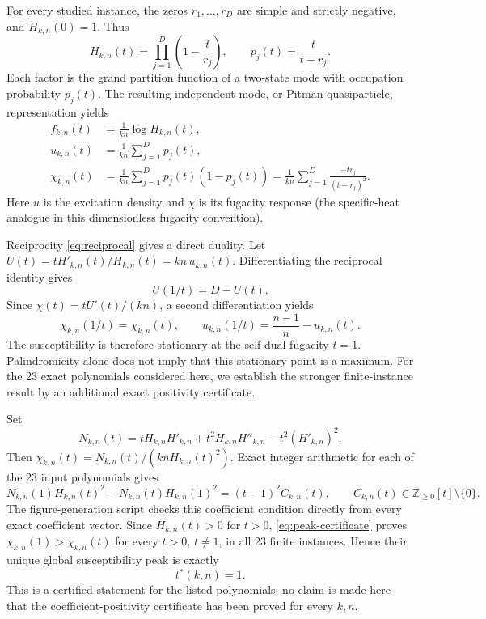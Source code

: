 \documentclass[11pt]{article}
\newcommand{\Z}{\mathbb{Z}}
\begin{document}
For every studied instance, the zeros $r_1,\ldots,r_D$ are simple and strictly negative, and $H_{k,n}(0)=1$. Thus
\begin{equation}
  H_{k,n}(t)=\prod_{j=1}^{D}\left(1-\frac{t}{r_j}\right),
  \qquad
  p_j(t)=\frac{t}{t-r_j}.
  \label{eq:pitman-factorization}
\end{equation}
Each factor is the grand partition function of a two-state mode with occupation probability $p_j(t)$. The resulting independent-mode, or Pitman quasiparticle, representation yields
\begin{align}
  f_{k,n}(t)&=\frac{1}{kn}\log H_{k,n}(t),\\
  u_{k,n}(t)&=\frac{1}{kn}\sum_{j=1}^{D}p_j(t),\\
  \chi_{k,n}(t)&=\frac{1}{kn}\sum_{j=1}^{D}p_j(t)(1-p_j(t))
  =\frac{1}{kn}\sum_{j=1}^{D}\frac{-t r_j}{(t-r_j)^2}.
  \label{eq:thermodynamics}
\end{align}
Here $u$ is the excitation density and $\chi$ is its fugacity response (the specific-heat analogue in this dimensionless fugacity convention).

Reciprocity \eqref{eq:reciprocal} gives a direct duality. Let $U(t)=tH'_{k,n}(t)/H_{k,n}(t)=kn\,u_{k,n}(t)$. Differentiating the reciprocal identity gives
\[
  U(1/t)=D-U(t).
\]
Since $\chi(t)=tU'(t)/(kn)$, a second differentiation yields
\begin{equation}
  \chi_{k,n}(1/t)=\chi_{k,n}(t),
  \qquad
  u_{k,n}(1/t)=\frac{n-1}{n}-u_{k,n}(t).
  \label{eq:duality}
\end{equation}
The susceptibility is therefore stationary at the self-dual fugacity $t=1$. Palindromicity alone does not imply that this stationary point is a maximum. For the 23 exact polynomials considered here, we establish the stronger finite-instance result by an additional exact positivity certificate.

Set
\[
  N_{k,n}(t)=tH_{k,n}H'_{k,n}+t^2H_{k,n}H''_{k,n}-t^2(H'_{k,n})^2.
\]
Then $\chi_{k,n}(t)=N_{k,n}(t)/(knH_{k,n}(t)^2)$. Exact integer arithmetic for each of the 23 input polynomials gives
\begin{equation}
  N_{k,n}(1)H_{k,n}(t)^2-N_{k,n}(t)H_{k,n}(1)^2
  =(t-1)^2 C_{k,n}(t),
  \qquad C_{k,n}(t)\in\Z_{\ge0}[t]\setminus\{0\}.
  \label{eq:peak-certificate}
\end{equation}
The figure-generation script checks this coefficient condition directly from every exact coefficient vector. Since $H_{k,n}(t)>0$ for $t>0$, \eqref{eq:peak-certificate} proves $\chi_{k,n}(1)>\chi_{k,n}(t)$ for every $t>0$, $t\ne1$, in all 23 finite instances. Hence their unique global susceptibility peak is exactly
\begin{equation}
  t^*(k,n)=1.
  \label{eq:peak}
\end{equation}
This is a certified statement for the listed polynomials; no claim is made here that the coefficient-positivity certificate has been proved for every $k,n$.
\end{document}
